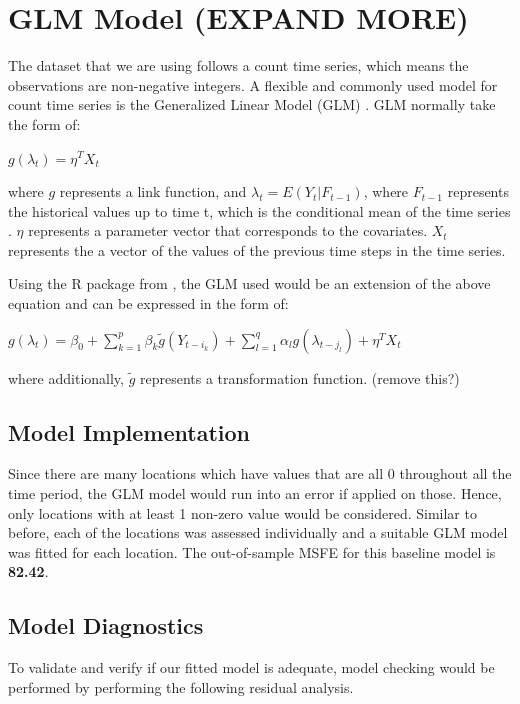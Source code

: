 \documentclass[12pt, letterpaper] {article}
\begin{document}
\section{GLM Model (EXPAND MORE)}
The dataset that we are using follows a count time series, which means the observations are non-negative integers. A flexible and commonly used model for count time series is the Generalized Linear Model (GLM) \cite{Nelder1972}. GLM normally take the form of:

\begin{center}
    $\displaystyle g(\lambda_t)= \eta^T X_t$
\end{center}

\noindent where $g$ represents a link function, and $\lambda_t = E(Y_t | F_{t-1})$, where $F_{t-1}$ represents the historical values up to time t, which is the conditional mean of the time series . $\eta$ represents a parameter vector that corresponds to the covariates. $X_t$ represents the a vector of the values of the previous time steps in the time series.

\noindent Using the R package from \cite{Tobias2017}, the GLM used would be an extension of the above equation and can be expressed in the form of:

\begin{center}
    $\displaystyle g(\lambda_t)=\beta_0 + \sum_{k=1}^{p}\beta_k\tilde{g}(Y_{t-i_k}) + \sum_{\mathit{l}=1}^{q}\alpha_\mathit{l} g(\lambda_{t-j_\mathit{l}}) + \eta^T X_t$
\end{center}

\noindent where additionally, $\tilde{g}$ represents a transformation function. (remove this?)

\subsection{Model Implementation}
\noindent Since there are many locations which have values that are all 0 throughout all the time period, the GLM model would run into an error if applied on those. Hence, only locations with at least 1 non-zero value would be considered. Similar to before, each of the locations was assessed individually and a suitable GLM model was fitted for each location. The out-of-sample MSFE for this baseline model is \textbf{82.42}. 

\subsection{Model Diagnostics}
To validate and verify if our fitted model is adequate, model checking would be performed by performing the following residual analysis.	
\end{document}
